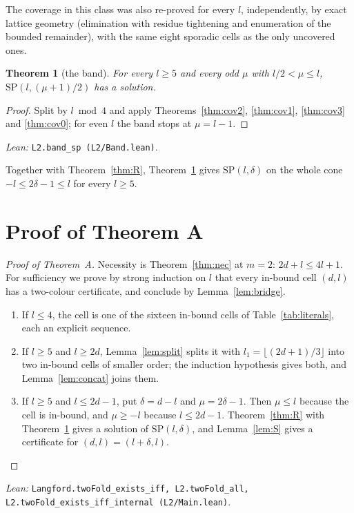 \documentclass[11pt]{amsart}
\theoremstyle{plain}
\newtheorem{theorem}{Theorem}[section]
\theoremstyle{definition}
\theoremstyle{remark}
\newcommand{\SP}{\mathrm{SP}}
\newcommand{\lean}[1]{\par\smallskip
  {\small\raggedright\noindent\textit{Lean:} \texttt{#1}.\par}\smallskip}
\begin{document}
The coverage in this class was also re-proved for every $l$, independently, by exact
lattice geometry (elimination with residue tightening and enumeration of the bounded
remainder), with the same eight sporadic cells as the only uncovered ones.

\begin{theorem}[the band]\label{thm:band}
For every $l \ge 5$ and every odd $\mu$ with $l/2 < \mu \le l$, $\SP(l,(\mu+1)/2)$ has
a solution.
\end{theorem}

\begin{proof}
Split by $l \bmod 4$ and apply Theorems~\ref{thm:cov2}, \ref{thm:cov1},
\ref{thm:cov3} and \ref{thm:cov0}; for even $l$ the band stops at $\mu = l-1$.
\end{proof}
\lean{L2.band\_sp (L2/Band.lean)}

Together with Theorem~\ref{thm:R}, Theorem~\ref{thm:band} gives $\SP(l,\delta)$ on the
whole cone $-l \le 2\delta-1 \le l$ for every $l \ge 5$.

\section{Proof of Theorem A}\label{sec:theorem}

\begin{proof}[Proof of Theorem~A]
Necessity is Theorem~\ref{thm:nec} at $m = 2$: $2d + l \le 4l+1$. For sufficiency we
prove by strong induction on $l$ that every in-bound cell $(d,l)$ has a two-colour
certificate, and conclude by Lemma~\ref{lem:bridge}.
\begin{enumerate}
\item If $l \le 4$, the cell is one of the sixteen in-bound cells of
  Table~\ref{tab:literals}, each an explicit sequence.
\item If $l \ge 5$ and $l \ge 2d$, Lemma~\ref{lem:split} splits it with
  $l_1 = \lfloor(2d+1)/3\rfloor$ into two in-bound cells of smaller order; the induction
  hypothesis gives both, and Lemma~\ref{lem:concat} joins them.
\item If $l \ge 5$ and $l \le 2d-1$, put $\delta = d - l$ and $\mu = 2\delta - 1$. Then
  $\mu \le l$ because the cell is in-bound, and $\mu \ge -l$ because $l \le 2d-1$.
  Theorem~\ref{thm:R} with Theorem~\ref{thm:band} gives a solution of $\SP(l,\delta)$,
  and Lemma~\ref{lem:S} gives a certificate for $(d,l) = (l+\delta,l)$.\qedhere
\end{enumerate}
\end{proof}
\lean{Langford.twoFold\_exists\_iff, L2.twoFold\_all, L2.twoFold\_exists\_iff\_internal
(L2/Main.lean)}
\end{document}
